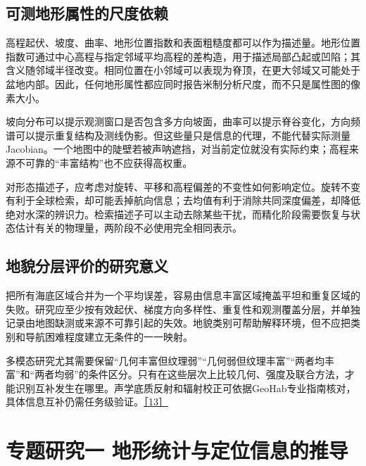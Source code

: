 \hypertarget{ux53efux6d4bux5730ux5f62ux5c5eux6027ux7684ux5c3aux5ea6ux4f9dux8d56}{%
\subsection{可测地形属性的尺度依赖}\label{ux53efux6d4bux5730ux5f62ux5c5eux6027ux7684ux5c3aux5ea6ux4f9dux8d56}}

高程起伏、坡度、曲率、地形位置指数和表面粗糙度都可以作为描述量。地形位置指数可通过中心高程与指定邻域平均高程的差构造，用于描述局部凸起或凹陷；其含义随邻域半径改变。相同位置在小邻域可以表现为脊顶，在更大邻域又可能处于盆地内部。因此，任何地形属性都应同时报告米制分析尺度，而不只是属性图的像素大小。

坡向分布可以提示观测窗口是否包含多方向坡面，曲率可以提示脊谷变化，方向频谱可以提示重复结构及测线伪影。但这些量只是信息的代理，不能代替实际测量Jacobian。一个地图中的陡壁若被声呐遮挡，对当前定位就没有实际约束；高程来源不可靠的``丰富结构''也不应获得高权重。

对形态描述子，应考虑对旋转、平移和高程偏差的不变性如何影响定位。旋转不变有利于全球检索，却可能丢掉航向信息；去均值有利于消除共同深度偏差，却降低绝对水深的辨识力。检索描述子可以主动去除某些干扰，而精化阶段需要恢复与状态估计有关的物理量，两阶段不必使用完全相同表示。

\hypertarget{ux5730ux8c8cux5206ux5c42ux8bc4ux4ef7ux7684ux7814ux7a76ux610fux4e49}{%
\subsection{地貌分层评价的研究意义}\label{ux5730ux8c8cux5206ux5c42ux8bc4ux4ef7ux7684ux7814ux7a76ux610fux4e49}}

把所有海底区域合并为一个平均误差，容易由信息丰富区域掩盖平坦和重复区域的失败。研究应至少按有效起伏、梯度方向多样性、重复性和观测覆盖分层，并单独记录由地图缺测或来源不可靠引起的失效。地貌类别可帮助解释环境，但不应把类别和导航困难程度建立无条件的一一映射。

多模态研究尤其需要保留``几何丰富但纹理弱''``几何弱但纹理丰富''``两者均丰富''和``两者均弱''的条件区分。只有在这些层次上比较几何、强度及联合方法，才能识别互补发生在哪里。声学底质反射和辐射校正可依据GeoHab专业指南核对，具体信息互补仍需任务级验证。\href{https://geohab.org/backscatter-working-group/}{［13］}

\hypertarget{ux4e13ux9898ux7814ux7a76ux4e00-ux5730ux5f62ux7edfux8ba1ux4e0eux5b9aux4f4dux4fe1ux606fux7684ux63a8ux5bfc}{%
\section{专题研究一 地形统计与定位信息的推导}\label{ux4e13ux9898ux7814ux7a76ux4e00-ux5730ux5f62ux7edfux8ba1ux4e0eux5b9aux4f4dux4fe1ux606fux7684ux63a8ux5bfc}}

